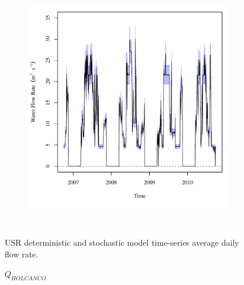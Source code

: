 \begin{linenumbers}
\begin{landscape}
\begin{figure}
\begin{subfigure}{0.7\textwidth}
		\end{subfigure}%
		\begin{subfigure}{0.7\textwidth}
			\centering
			\includegraphics[width=\tableCustomSize]{"Figures/Results_USR/Stochastic/Q FLY"}
		\end{subfigure}\\
		\caption{USR deterministic and stochastic model time-series average daily flow rate.}
	\end{figure}
\end{landscape}
\subfiguremid
\begin{landscape}
	\begin{figure}
		\centering
		$ Q_{HOLCANCO} $
		\begin{subfigure}{0.7\textwidth}
			\centering

\end{subfigure}
\end{figure}
\end{landscape}
\end{linenumbers}
